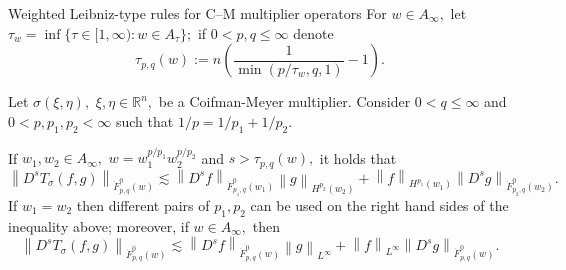 \documentclass[xcolor=dvipsnames]{beamer}
\newcommand{\rn}{{{\mathbb R}^n}}
\newcommand{\norm}[2]{{\left\| #1 \right\|}_{#2}}
\newcommand{\tlw}[4]{\dot F_{#1,#3}^{#2}(#4)} %
\newcommand{\hcline}{1/p=1/p_1+1/p_2}
\begin{document}
\begin{frame}{Weighted Leibniz-type rules for C--M multiplier operators}
For $w\in A_\infty,$  let $\tau_w=\inf\{\tau\in [1,\infty): w\in A_\tau\};$ if  $0<p,q\le \infty$ denote 
\begin{equation*}
\tau_{p,q}(w) := n \left(\frac{1}{\min(p/\tau_w,q,1)} - 1 \right).
\end{equation*} 

\begin{theorem}[Naibo--T., 2018]\label{thm:CM:TL:B}  
Let $\sigma(\xi,\eta),$ $\xi,\eta\in\rn,$ be a Coifman-Meyer multiplier. Consider  $0 < q \leq \infty$ and $0 < p, p_1, p_2  < \infty$  such that $\hcline.$ 

\medskip

If  $w_1,w_2\in A_\infty,$ $w=w_1^{{p}/{p_1}} w_2^{{p}/{p_2}}$  and  $s > \tau_{p,q}(w),$  it holds that
\begin{equation*}
\norm{D^s T_\sigma(f,g)}{\tlw{p}{0}{q}{w}} \lesssim \norm{D^s f}{\tlw{p_1}{0}{q}{w_1} } \norm{g}{H^{p_2}(w_2)} +  \norm{f}{H^{p_1}(w_1)}   \norm{D^s g}{\tlw{p_2}{0}{q}{w_2} }.
\end{equation*}
If $w_1=w_2$ then different pairs of $p_1, p_2$ can be used on the right hand sides of the inequality above; moreover, if $w\in A_\infty,$ then 
\begin{equation*}
\norm{D^s T_\sigma(f,g)}{\tlw{p}{0}{q}{w}} \lesssim \norm{D^s f}{\tlw{p}{0}{q}{w} } \norm{g}{L^\infty} +  \norm{f}{L^\infty}   \norm{D^s g}{\tlw{p}{0}{q}{w}}.
\end{equation*}
\end{theorem}
\end{frame}


%
%
%
%
%
%
%
%
\end{document}
